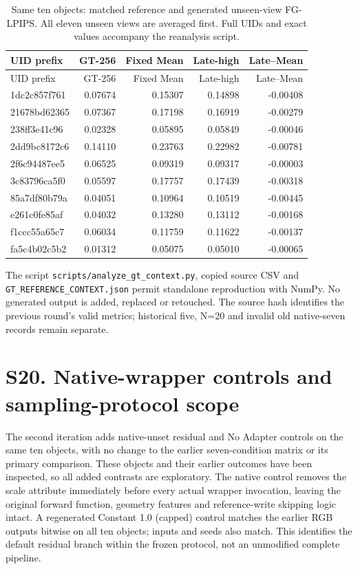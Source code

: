 \documentclass[11pt]{article}
\begin{document}
\begin{longtable}{lrrrr}
\caption{Same ten objects: matched reference and generated unseen-view FG-LPIPS. All eleven unseen views are averaged first. Full UIDs and exact values accompany the reanalysis script.}\\
\toprule UID prefix & GT-256 & Fixed Mean & Late-high & Late--Mean \\
\midrule\endfirsthead
\toprule UID prefix & GT-256 & Fixed Mean & Late-high & Late--Mean \\
\midrule\endhead
1dc2c857f761 & 0.07674 & 0.15307 & 0.14898 & -0.00408 \\
21678bd62365 & 0.07367 & 0.17198 & 0.16919 & -0.00279 \\
238ff3e41c96 & 0.02328 & 0.05895 & 0.05849 & -0.00046 \\
2dd9bc8172c6 & 0.14110 & 0.23763 & 0.22982 & -0.00781 \\
2f6c94487ee5 & 0.06525 & 0.09319 & 0.09317 & -0.00003 \\
3c83796ca5f0 & 0.05597 & 0.17757 & 0.17439 & -0.00318 \\
85a7df80b79a & 0.04051 & 0.10964 & 0.10519 & -0.00445 \\
e261c0fe85af & 0.04032 & 0.13280 & 0.13112 & -0.00168 \\
f1ccc55a65c7 & 0.06034 & 0.11759 & 0.11622 & -0.00137 \\
fa5c4b02c5b2 & 0.01312 & 0.05075 & 0.05010 & -0.00065 \\
\bottomrule\end{longtable}
The script \texttt{scripts/analyze\_gt\_context.py}, copied source CSV and \texttt{GT\_REFERENCE\_CONTEXT.json} permit standalone reproduction with NumPy. No generated output is added, replaced or retouched. The source hash identifies the previous round's valid metrics; historical five, N=20 and invalid old native-seven records remain separate.


\section*{S20. Native-wrapper controls and sampling-protocol scope}
The second iteration adds native-unset residual and No Adapter controls on the same ten objects, with no change to the earlier seven-condition matrix or its primary comparison. These objects and their earlier outcomes have been inspected, so all added contrasts are exploratory. The native control removes the scale attribute immediately before every actual wrapper invocation, leaving the original forward function, geometry features and reference-write skipping logic intact. A regenerated Constant 1.0 (capped) control matches the earlier RGB outputs bitwise on all ten objects; inputs and seeds also match. This identifies the default residual branch within the frozen protocol, not an unmodified complete pipeline.
\end{document}
